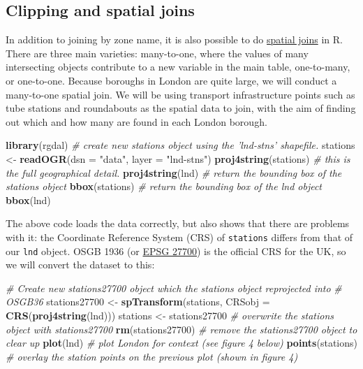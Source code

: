 \documentclass[]{article}
\newenvironment{Shaded}{}{}
\newcommand{\KeywordTok}[1]{\textcolor[rgb]{0.00,0.44,0.13}{\textbf{{#1}}}}
\newcommand{\DataTypeTok}[1]{\textcolor[rgb]{0.56,0.13,0.00}{{#1}}}
\newcommand{\StringTok}[1]{\textcolor[rgb]{0.25,0.44,0.63}{{#1}}}
\newcommand{\CommentTok}[1]{\textcolor[rgb]{0.38,0.63,0.69}{\textit{{#1}}}}
\newcommand{\NormalTok}[1]{{#1}}
\begin{document}
\subsection{Clipping and spatial
joins}\label{clipping-and-spatial-joins}

In addition to joining by zone name, it is also possible to do
\href{http://help.arcgis.com/en/arcgisdesktop/10.0/help/index.html\#//00080000000q000000}{spatial
joins} in R. There are three main varieties: many-to-one, where the
values of many intersecting objects contribute to a new variable in the
main table, one-to-many, or one-to-one. Because boroughs in London are
quite large, we will conduct a many-to-one spatial join. We will be
using transport infrastructure points such as tube stations and
roundabouts as the spatial data to join, with the aim of finding out
which and how many are found in each London borough.

\begin{Shaded}
\begin{Highlighting}[]
\KeywordTok{library}\NormalTok{(rgdal)}
\CommentTok{# create new stations object using the 'lnd-stns' shapefile.}
\NormalTok{stations <-}\StringTok{ }\KeywordTok{readOGR}\NormalTok{(}\DataTypeTok{dsn =} \StringTok{"data"}\NormalTok{, }\DataTypeTok{layer =} \StringTok{"lnd-stns"}\NormalTok{)}
\KeywordTok{proj4string}\NormalTok{(stations)  }\CommentTok{# this is the full geographical detail.}
\KeywordTok{proj4string}\NormalTok{(lnd)}
\CommentTok{# return the bounding box of the stations object}
\KeywordTok{bbox}\NormalTok{(stations)}
\CommentTok{# return the bounding box of the lnd object}
\KeywordTok{bbox}\NormalTok{(lnd)}
\end{Highlighting}
\end{Shaded}

The above code loads the data correctly, but also shows that there are
problems with it: the Coordinate Reference System (CRS) of
\texttt{stations} differs from that of our \texttt{lnd} object. OSGB
1936 (or \href{http://spatialreference.org/ref/epsg/27700/}{EPSG 27700})
is the official CRS for the UK, so we will convert the dataset to this:

\begin{Shaded}
\begin{Highlighting}[]
\CommentTok{# Create new stations27700 object which the stations object reprojected into}
\CommentTok{# OSGB36}
\NormalTok{stations27700 <-}\StringTok{ }\KeywordTok{spTransform}\NormalTok{(stations, }\DataTypeTok{CRSobj =} \KeywordTok{CRS}\NormalTok{(}\KeywordTok{proj4string}\NormalTok{(lnd)))}
\NormalTok{stations <-}\StringTok{ }\NormalTok{stations27700  }\CommentTok{# overwrite the stations object with stations27700}
\KeywordTok{rm}\NormalTok{(stations27700)  }\CommentTok{# remove the stations27700 object to clear up}
\KeywordTok{plot}\NormalTok{(lnd)  }\CommentTok{# plot London for context (see figure 4 below) }
\KeywordTok{points}\NormalTok{(stations)  }\CommentTok{# overlay the station points on the previous plot (shown in figure 4)}
\end{Highlighting}
\end{Shaded}
\end{document}

